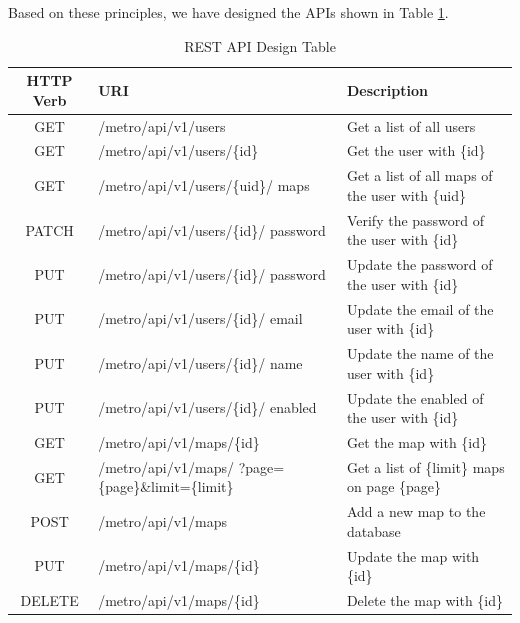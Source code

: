 Based on these principles, we have designed the APIs shown in Table \ref{tab:REST API Design Table}.
\begin{table}[!htb]
  \centering
  \begin{tabularx}{\textwidth}{>{\raggedright}cXX} %
    \toprule[1.5pt]
    \textbf{HTTP Verb} & \textbf{URI} & \textbf{Description}
    \\ \midrule[1.5pt]
    GET & /metro/api/v1/users & Get a list of all users
    \\ \midrule
    GET & /metro/api/v1/users/\{id\} & Get the user with \{id\}
    \\ \midrule
    GET & /metro/api/v1/users/\{uid\}/ maps & Get a list of all maps of the user with \{uid\}
    \\ \midrule
    PATCH & /metro/api/v1/users/\{id\}/ password & Verify the password of the user with \{id\}
    \\ \midrule
    PUT & /metro/api/v1/users/\{id\}/ password & Update the password of the user with \{id\}
    \\ \midrule
    PUT & /metro/api/v1/users/\{id\}/ email & Update the email of the user with \{id\} \\ \midrule
    PUT & /metro/api/v1/users/\{id\}/ name & Update the name of the user with \{id\} \\ \midrule
    PUT & /metro/api/v1/users/\{id\}/ enabled & Update the enabled of the user with \{id\}
    \\ \midrule
    GET & /metro/api/v1/maps/\{id\} & Get the map with \{id\}
    \\ \midrule
    GET & /metro/api/v1/maps/ ?page=\{page\}\&limit=\{limit\} & Get a list of \{limit\} maps on page \{page\}
    \\ \midrule
    POST & /metro/api/v1/maps & Add a new map to the database
    \\ \midrule
    PUT & /metro/api/v1/maps/\{id\} & Update the map with \{id\}
    \\ \midrule
    DELETE & /metro/api/v1/maps/\{id\} & Delete the map with \{id\}
    \\ \bottomrule[1.5pt]
  \end{tabularx}
  \caption[REST API Design Table]{REST API Design Table}
  \label{tab:REST API Design Table}
\end{table}

